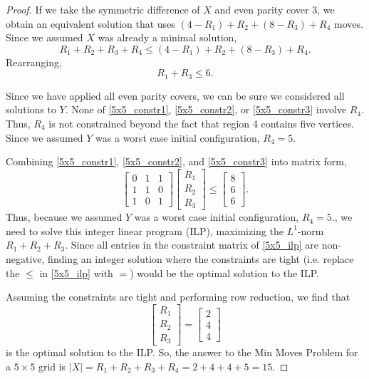 \documentclass[a4paper]{article}
\newcommand{\abs}[1]{\left| #1 \right|}
\begin{document}
\begin{proof}
		If we take the symmetric difference of $X$ and even parity cover 3, we obtain an equivalent solution that uses $(4 - R_1) + R_2 + (8 - R_3) + R_4$ moves.
		Since we assumed $X$ was already a minimal solution,
		\begin{equation*}
			R_1 + R_2 + R_3 + R_4 \leq (4 - R_1) + R_2 + (8 - R_3) + R_4.
		\end{equation*}
		Rearranging,
		\begin{equation}\label{5x5_constr3}
			R_1 + R_3 \leq 6.
		\end{equation}
	
		Since we have applied all even parity covers, we can be sure we considered all solutions to $Y$.
		None of \eqref{5x5_constr1}, \eqref{5x5_constr2}, or \eqref{5x5_constr3} involve $R_4$.
		Thus, $R_4$ is not constrained beyond the fact that region 4 contains five vertices.
		Since we assumed $Y$ was a worst case initial configuration, $R_4 = 5$.
	
		Combining \eqref{5x5_constr1}, \eqref{5x5_constr2}, and \eqref{5x5_constr3} into matrix form,
		\begin{equation}\label{5x5_ilp}
			\begin{bmatrix}
				0 & 1 & 1 \\
				1 & 1 & 0 \\
				1 & 0 & 1
			\end{bmatrix}
			\begin{bmatrix}
				R_1 \\
				R_2 \\
				R_3
			\end{bmatrix}
			\leq
			\begin{bmatrix}
				8 \\
				6 \\
				6
			\end{bmatrix}.
		\end{equation}
		Thus, because we assumed $Y$ was a worst case initial configuration, $R_4 = 5$., we need to solve this integer linear program (ILP), maximizing the $L^1$-norm $R_1 + R_2 + R_3$.
		Since all entries in the constraint matrix of \eqref{5x5_ilp} are non-negative, finding an integer solution where the constraints are tight (i.e. replace the $\leq$ in \eqref{5x5_ilp} with $=$) would be the optimal solution to the ILP.
		
		Assuming the constraints are tight and performing row reduction, we find that
		\begin{equation*}
			\begin{bmatrix}
				R_1 \\
				R_2 \\
				R_3
			\end{bmatrix}
			=
			\begin{bmatrix}
				2 \\
				4 \\
				4
			\end{bmatrix}
		\end{equation*}
		is the optimal solution to the ILP.
		So, the answer to the Min Moves Problem for a $5 \times 5$ grid is $\abs{X} = R_1 + R_2 + R_3 + R_4 = 2 + 4 + 4 + 5 = 15$.
	\end{proof}
\end{document}
